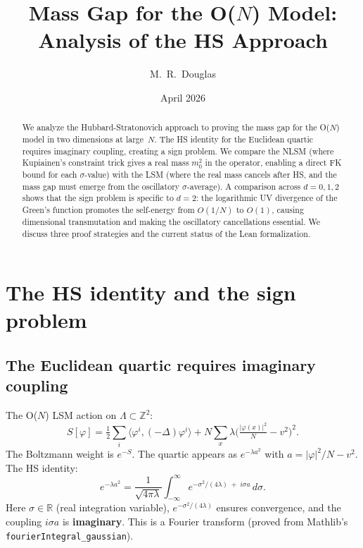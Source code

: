 \documentclass[12pt]{article}
\title{Mass Gap for the O($N$) Model: Analysis of the HS Approach}
\author{M.~R.~Douglas}
\date{April 2026}
\theoremstyle{definition}
\theoremstyle{remark}
\newcommand{\R}{\mathbb{R}}
\newcommand{\Z}{\mathbb{Z}}
\newcommand{\ph}{\varphi}
\newcommand{\La}{\Lambda}
\begin{document}
\maketitle

\begin{abstract}
We analyze the Hubbard-Stratonovich approach to proving the mass
gap for the O($N$) model in two dimensions at large~$N$. The HS
identity for the Euclidean quartic requires imaginary coupling,
creating a sign problem. We compare the NLSM (where Kupiainen's
constraint trick gives a real mass $m_0^2$ in the operator, enabling
a direct FK bound for each $\sigma$-value) with the LSM (where the
real mass cancels after HS, and the mass gap must emerge from the
oscillatory $\sigma$-average). A comparison across $d=0,1,2$ shows
that the sign problem is specific to $d=2$: the logarithmic UV
divergence of the Green's function promotes the self-energy from
$O(1/N)$ to $O(1)$, causing dimensional transmutation and making
the oscillatory cancellations essential. We discuss three proof
strategies and the current status of the Lean formalization.
\end{abstract}

\tableofcontents

\section{The HS identity and the sign problem}

\subsection{The Euclidean quartic requires imaginary coupling}

The O($N$) LSM action on $\La \subset \Z^2$:
\begin{equation}
  S[\ph] = \tfrac{1}{2}\sum_i\langle\ph^i,(-\Delta)\ph^i\rangle
    + N\sum_x\lambda\bigl(\tfrac{|\ph(x)|^2}{N}-v^2\bigr)^2.
\end{equation}
The Boltzmann weight is $e^{-S}$. The quartic appears as
$e^{-\lambda a^2}$ with $a = |\ph|^2/N - v^2$. The HS identity:
\begin{equation}
\label{eq:HS}
  e^{-\lambda a^2}
    = \frac{1}{\sqrt{4\pi\lambda}}\int_{-\infty}^{\infty}
      e^{-\sigma^2/(4\lambda)\;+\;i\sigma a}\,d\sigma.
\end{equation}
Here $\sigma \in \R$ (real integration variable),
$e^{-\sigma^2/(4\lambda)}$ ensures convergence, and the coupling
$i\sigma a$ is \textbf{imaginary}. This is a Fourier transform
(proved from Mathlib's \texttt{fourierIntegral\_gaussian}).
\end{document}
